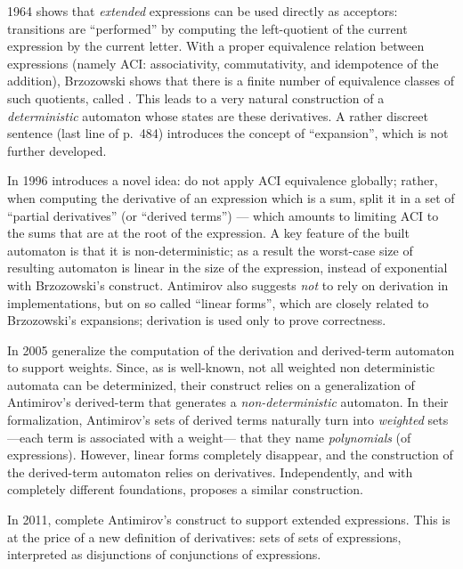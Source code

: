 \documentclass[a4paper,USenglish]{lipics}
\begin{document}
 1964
\citet{brzozowski.64.jacm} shows that \emph{extended} expressions can be
used directly as acceptors: transitions are ``performed'' by computing the
left-quotient of the current expression by the current letter.  With a
proper equivalence relation between expressions (namely ACI: associativity,
commutativity, and idempotence of the addition), Brzozowski shows that there
is a finite number of equivalence classes of such quotients, called
.  This leads to a very natural construction of a
\emph{deterministic} automaton whose states are these derivatives.  A rather
discreet sentence (last line of p.~484) introduces the concept of
``expansion'', which is not further developed.

In 1996 \citet{antimirov.1996.tcs} introduces a novel idea: do not apply ACI
equivalence globally; rather, when computing the derivative of an expression
which is a sum, split it in a set of ``partial derivatives'' (or ``derived
terms'') --- which amounts to limiting ACI to the sums that are at the root
of the expression.  A key feature of the built automaton is that it is
non-deterministic; as a result the worst-case size of resulting automaton is
linear in the size of the expression, instead of exponential with
Brzozowski's construct.  Antimirov also suggests \emph{not} to rely on
derivation in implementations, but on so called ``linear forms'', which are
closely related to Brzozowski's expansions; derivation is used only to prove
correctness.

In 2005 \citet{lombardy.2005.tcs} generalize the computation of the
derivation and derived-term automaton to support weights.  Since, as is
well-known, not all weighted non deterministic automata can be determinized,
their construct relies on a generalization of Antimirov's derived-term that
generates a \emph{non-deterministic} automaton.  In their formalization,
Antimirov's sets of derived terms naturally turn into \emph{weighted} sets
---each term is associated with a weight--- that they name
\emph{polynomials} (of expressions).  However, linear forms completely
disappear, and the construction of the derived-term automaton relies on
derivatives.  Independently, and with completely different foundations,
\citet{rutten.1999.icalp, rutten.2003.tcs} proposes a similar construction.

In 2011, \citet{caron.2011.lata.2} complete Antimirov's construct to support
extended expressions.  This is at the price of a new definition of
derivatives: sets of sets of expressions, interpreted as disjunctions of
conjunctions of expressions.
\end{document}
